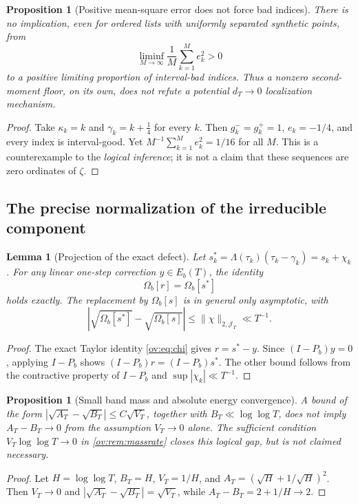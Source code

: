 \documentclass[11pt,reqno]{amsart}
\numberwithin{equation}{section}
\newtheorem{proposition}[theorem]{Proposition}
\newtheorem{lemma}[theorem]{Lemma}
\newcommand{\lamb}{\Lambda}
\begin{document}
\begin{proposition}[Positive mean-square error does not force bad indices]
\label{prop:floornoobstruction}
There is no implication, even for ordered lists with uniformly separated
synthetic points, from
\[
\liminf_{M\to\infty}\frac1M\sum_{k=1}^M e_k^2>0
\]
to a positive limiting proportion of interval-bad indices. Thus a
nonzero second-moment floor, on its own, does not refute a
potential $d_T\to0$ localization mechanism.
\end{proposition}
\begin{proof}
Take $\kappa_k=k$ and $\gamma_k=k+\frac14$ for every $k$.
Then $g_k^-=g_k^+=1$, $e_k=-1/4$, and every index is
interval-good. Yet $M^{-1}\sum_{k=1}^M e_k^2=1/16$ for all $M$.
This is a counterexample to the \emph{logical inference}; it is not a
claim that these sequences are zero ordinates of $\zeta$.
\end{proof}

\subsection{The precise normalization of the irreducible component}
\begin{lemma}[Projection of the exact defect]
\label{lem:exactOmegaChi}
Let $s_k^*=\lamb(\tau_k)(\tau_k-\gamma_k)=s_k+\chi_k$.
For any linear one-step correction $y\in E_b(T)$, the identity
\begin{equation}\label{eq:exactOmegaChi}
\Omega_b[r]=\Omega_b[s^*]
\end{equation}
holds exactly. The replacement by $\Omega_b[s]$ is in general
only asymptotic, with
\begin{equation}\label{eq:chiOmegabound}
\left|\sqrt{\Omega_b[s^*]}-\sqrt{\Omega_b[s]}\right|
\le\|\chi\|_{2,\mathcal J_T}\ll T^{-1}.
\end{equation}
\end{lemma}
\begin{proof}
The exact Taylor identity \eqref{ov:eq:chi} gives $r=s^*-y$.
Since $(I-P_b)y=0$, applying $I-P_b$ shows
$(I-P_b)r=(I-P_b)s^*$. The other bound follows from the
contractive property of $I-P_b$ and $\sup|\chi_k|\ll T^{-1}$.
\end{proof}

\begin{proposition}[Small band mass and absolute energy convergence]
\label{prop:massnecessitylogic}
A bound of the form
$|\sqrt{A_T}-\sqrt{B_T}|\le C\sqrt{V_T}$, together with
$B_T\ll\log\log T$, does \emph{not} imply $A_T-B_T\to0$
from the assumption $V_T\to0$ alone. The sufficient condition
$V_T\log\log T\to0$ in \cref{ov:rem:massrate} closes this
logical gap, but is not claimed necessary.
\end{proposition}
\begin{proof}
Let $H=\log\log T$, $B_T=H$, $V_T=1/H$, and
$A_T=(\sqrt H+1/\sqrt H)^2$. Then $V_T\to0$ and
$|\sqrt{A_T}-\sqrt{B_T}|=\sqrt{V_T}$, while
$A_T-B_T=2+1/H\to2$.
\end{proof}
\end{document}
